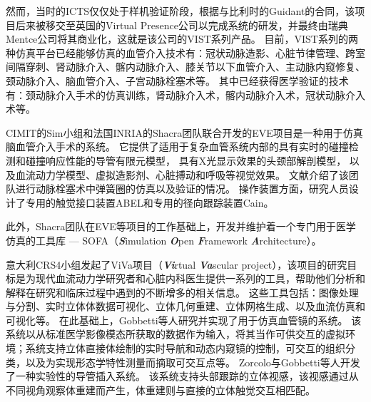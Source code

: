 然而，当时的ICTS仅仅处于样机验证阶段，根据与比利时的Guidant的合同，该项目后来被移交至英国的Virtual Presence公司以完成系统的研发，并最终由瑞典Mentce公司\cite{menticeweb}将其商业化\cite{GuidantMenticeNewsWeb}\cite{coles2011surveyCRaIVE}，这就是该公司的VIST系列产品。
目前，VIST系列的两种仿真平台已经能够仿真的血管介入技术有：冠状动脉造影、心脏节律管理、跨室间隔穿刺、肾动脉介入、髂内动脉介入、膝关节以下血管介入、主动脉内窥修复、颈动脉介入、脑血管介入、子宫动脉栓塞术等\cite{menticeweb}。
其中已经获得医学验证的技术有：颈动脉介入手术的仿真训练\cite{Dayal2004VIST}\cite{Hsu2004VIST}\cite{Nicholson2006VIST}\cite{Patel2006VIST}\cite{Cates2007VIST}\cite{VanHerzeele2009VIST}，肾动脉介入术\cite{Aggarwal2006}\cite{Glaiberman2008VIST}，髂内动脉介入术\cite{Chaer2006VIST}\cite{Berry2007VIST}\cite{VanHerzeele2008VIST}，冠状动脉介入术\cite{Gallagher2006VIST}等。

CIMIT的Sim小组\cite{medicalsimweb}和法国INRIA的Shacra团队\cite{shacraweb}联合开发的EVE项目\cite{Wu2005EVE}\cite{dequidt2007}是一种用于仿真脑血管介入手术的系统。
它提供了适用于复杂血管系统内部的具有实时的碰撞检测和碰撞响应性能的导管有限元模型\cite{dequidt2007}\cite{Duriez2006EVE}\cite{Lenoir2006EVE}\cite{Lenoir2005EVE}\cite{Cotin2005EVE}，
具有X光显示效果的头颈部解剖模型\cite{Wu2011MedicalSim}\cite{Luboz2005EVE}\cite{Muniyandi2003EVE}，
以及血流动力学模型、虚拟造影剂、心脏搏动和呼吸\cite{Wu2007EVE}等视觉效果。
文献\cite{Dequidt2008INRIA}介绍了该团队进行动脉栓塞术中弹簧圈的仿真以及验证的情况。
操作装置方面，研究人员设计了专用的触觉接口装置ABEL和专用的径向跟踪装置Cain\cite{medicalsimweb}。

此外，Shacra团队在EVE等项目的工作基础上，开发并维护着一个专门用于医学仿真的工具库 --- SOFA（\textbf{\textit{S}}imulation \textbf{\textit{O}}pen \textbf{\textit{F}}ramework \textbf{\textit{A}}rchitecture）\cite{Allard2007SOFA}。

意大利CRS4小组发起了ViVa项目（\textbf{\textit{Vi}}rtual \textbf{\textit{Va}}scular project）\cite{abdoulaev1998}，该项目的研究目标是为现代血流动力学研究者和心脏内科医生提供一系列的工具，帮助他们分析和解释在研究和临床过程中遇到的不断增多的相关信息。
这些工具包括：图像处理与分割、实时立体体数据可视化、立体几何重建、立体网格生成、以及血流仿真和可视化等。
在此基础上，Gobbetti等人\cite{Gobbetti1998}研究并实现了用于仿真血管镜的系统。
该系统以从标准医学影像模态所获取的数据作为输入，将其当作可供交互的虚拟环境；系统支持立体直接体绘制的实时导航和动态内窥镜的控制，可交互的组织分类，以及为实现形态学特性测量而摘取可交互点等。
Zorcolo与Gobbetti等人\cite{Zorcolo1999}\cite{Gobbetti2000}\cite{Zorcolo2000}开发了一种实验性的导管插入系统。
该系统支持头部跟踪的立体视感，该视感通过从不同视角观察体重建而产生，体重建则与直接的立体触觉交互相匹配。

